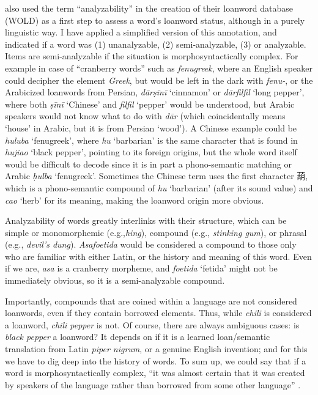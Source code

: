 \textcite[12]{haspelmath_loanwords_2009} also used the term ``analyzability'' in the creation of their loanword database (\gls{WOLD}) as a first step to assess a word's loanword status, although in a purely linguistic way. I have applied a simplified version of this annotation, and indicated if a word was (1) unanalyzable, (2) semi-analyzable, (3) or analyzable. Items are semi-analyzable if the situation is morphosyntactically complex. For example in case of ``cranberry words'' such as \textit{fenugreek}, where an English speaker could decipher the element \textit{Greek}, but would be left in the dark with \textit{fenu-}, or the Arabicized loanwords from Persian, \textit{dārṣīnī} `cinnamon' or \textit{dārfilfil} `long pepper', where both \textit{ṣīnī} `Chinese' and \textit{filfil} `pepper' would be understood, but Arabic speakers would not know what to do with \textit{dār} (which coincidentally means `house' in Arabic, but it is from Persian `wood'). A Chinese example could be \textit{huluba} `fenugreek', where \textit{hu} `barbarian' is the same character that is found in \textit{hujiao} `black pepper', pointing to its foreign origins, but the whole word itself would be difficult to decode since it is in part a phono-semantic matching or Arabic \textit{ḥulba} `fenugreek'. Sometimes the Chinese term uses the first character 葫, which is a phono-semantic compound of \textit{hu} `barbarian' (after its sound value) and \textit{cao} `herb' for its meaning, making the loanword origin more obvious. 

Analyzability of words greatly interlinks with their structure, which can be simple or monomorphemic (e.g.,\textit{hing}), compound (e.g., \textit{stinking gum}), or phrasal (e.g., \textit{devil's dung}). \textit{Asafoetida} would be considered a compound to those only who are familiar with either Latin, or the history and meaning of this word. Even if we are, \textit{asa} is a cranberry morpheme, and \textit{foetida} `fetida' might not be immediately obvious, so it is a semi-analyzable compound. 

Importantly, compounds that are coined within a language are not considered loanwords, even if they contain borrowed elements. Thus, while \textit{chili} is considered a loanword, \textit{chili pepper} is not. Of course, there are always ambiguous cases: is \textit{black pepper} a loanword? It depends on if it is a learned loan/semantic translation from Latin \textit{piper nigrum}, or a genuine English invention; and for this we have to dig deep into the history of words. To sum up, we could say that if a word is morphosyntactically complex, ``it was almost certain that it was created by speakers of the language rather than borrowed from some other language'' \autocite[12]{haspelmath_loanwords_2009}. 

